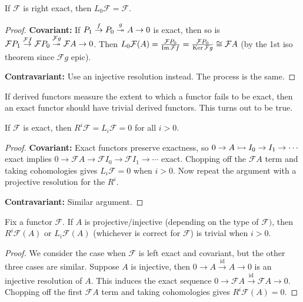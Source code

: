 \documentclass[twoside,10pt]{report}
\begin{document}
\begin{prop}
	\label{right-exact-left-0}
	If $\mathcal{F}$ is right exact, then $L_0\mathcal{F} = \mathcal{F}$.
\end{prop}
\begin{proof}
	\textbf{Covariant:} If $P_1\stackrel{f}{\to } P_0\stackrel{g }{\twoheadrightarrow } A\to 0$ is exact, then so is $\mathcal{F}P_1\stackrel{\mathcal{F}f}{\to } \mathcal{F}P_0\stackrel{\mathcal{F}g}{\twoheadrightarrow } \mathcal{F}A\to 0$. Then $L_0\mathcal{F}(A) = \frac{\mathcal{F}P_0}{\operatorname{Im} \mathcal{F}f} = \frac{\mathcal{F}P_0}{\operatorname{Ker} \mathcal{F}g} \cong \mathcal{F}A$ (by the 1st iso theorem since $\mathcal{F}g$ epic).

	\textbf{Contravariant:} Use an injective resolution instead. The process is the same.
\end{proof}


\begin{thrm}
\end{thrm}

If derived functors measure the extent to which a functor fails to be exact, then an exact functor should have trivial derived functors. This turns out to be true.

\begin{prop}
If $\mathcal{F}$ is exact, then $R^{i}\mathcal{F}=L_{i}\mathcal{F}=0$ for all $i>0$.
\end{prop}
\begin{proof}
	\textbf{Covariant:} Exact functors preserve exactness, so $0\to A\rightarrowtail I_0\to I_1\to \cdots$ exact implies $0\to \mathcal{F}A\to \mathcal{F}I_0\to \mathcal{F}I_1\to \cdots$ exact. Chopping off the $\mathcal{F}A$ term and taking cohomologies gives $L_{i}\mathcal{F} = 0$ when $i>0$. Now repeat the argument with a projective resolution for the $R^{i}$.

	\textbf{Contravariant:} Similar argument.
\end{proof}

\begin{prop}
	Fix a functor $\mathcal{F}$. If $A$ is projective/injective (depending on the type of $\mathcal{F})$, then $R^{i}\mathcal{F}(A)$ or $L_{i}\mathcal{F}(A)$ (whichever is correct for $\mathcal{F}$) is trivial when $i>0$.
\end{prop}
\begin{proof}
	We consider the case when $\mathcal{F}$ is left exact and covariant, but the other three cases are similar. Suppose $A$ is injective, then $0\to A\stackrel{\text{id}}{\to }  A\to 0$ is an injective resolution of $A$. This induces the exact sequence $0\to \mathcal{F}A \stackrel{\text{id}}{\to }  \mathcal{F}A \to 0$. Chopping off the first $\mathcal{F}A$ term and taking cohomologies gives $R^{i}\mathcal{F}(A)=0$.
\end{proof}
\end{document}
